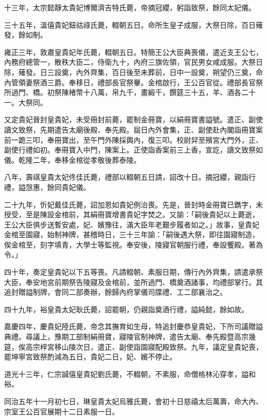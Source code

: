 \begin{pinyinscope}
十三年，太宗懿靜太貴妃博爾濟吉特氏薨，帝摘冠纓，躬詣致祭，餘同太妃儀。

三十五年，溫僖貴妃鈕祜祿氏薨，輟朝五日。命所生皇子成服，大祭日除，百日薙發，餘如制。

雍正三年，敦肅皇貴妃年氏薨，輟朝五日。特簡王公大臣典喪儀，遣近支王公七，內務府總管一，散秩大臣二，侍衛九十，內府三旗佐領，官民男女咸成服。大祭日除，薙發。日三設奠，內外齊集，百日後至未葬前，日中一設奠，朔望仍三奠，命內管領妻祭酒三爵。奉移日，禮部長官祭轝。金棺啟行，王公百官從。禮部長官祭所過門、橋。初祭陳楮幣十八萬，帛九千，畫緞千，饌筵三十五，羊、酒各二十一。大祭同。

又定貴妃晉封皇貴妃，未受冊封前薨，罷制金冊寶，以絹冊寶書謚號。遣正、副使讀文致祭，先期遣告太廟後殿、奉先殿。屆日內外會集，正、副使赴內閣詣冊寶案前一跪三叩，奉冊寶出，至午門外陳採輿內，復三叩。校尉舁至殯宮大門外，正、副使行禮如初。奉冊寶入中門，陳案上。正使詣香案前三上香，宣訖，讀文致祭如儀。乾隆二年，奉移金棺從孝敬後葬泰陵。

八年，壽祺皇貴太妃佟佳氏薨，禮部以輟朝五日請，詔改十日。摘冠纓，親詣行禮，謚愨惠，餘同貴妃儀。

二十九年，忻妃戴佳氏薨，詔加恩如貴妃例治喪。先是，晉封時金冊寶已鐫字，未授受，至是陳設金棺前，其絹冊寶增書貴妃字焚之。又諭：「嗣後貴妃以上薨逝，王公大臣俱步送暫安處，妃、嬪豫往，滿大臣年老艱步履者如之。」故事，皇貴妃金棺至園寢，始制神牌，甚稽時日，三十三年諭：「嗣後遇大祭，即往園寢制造，俟金棺至，刻字填青，大學士等監視。奉安後，陵寢官朝服行禮，奉設饗殿。著為令。」

四十年，奏定皇貴妃以下五等喪。凡請輟朝、素服日期，傳行內外齊集，請遣承祭大臣，奉安地宮前期祭告陵寢及金棺前，並所過門、橋奠酒諸事，均禮部掌行。其追封贈謚制牌，會同二部奏辦，餘歸內府掌儀司牒禮、工二部襄治之。

四十九年，裕皇貴太妃耿氏薨，詔罷朝，仍親詣奠酒行禮，謚純懿，餘如故。

嘉慶四年，慶貴妃陸氏薨，帝念其撫育如生母，特追封慶恭皇貴妃，下所司議贈謚典禮。尋議上，豫期工部制絹冊寶，寢陵官制神牌，遣告太廟、奉先殿暨高宗幾筵，俟高宗梓宮移山陵次日，遣正、副使詣園寢配殿致祭。九年，議定皇貴妃喪，罷坤寧宮致祭酌減為五日，貴妃二日，妃、嬪不停止。

道光十三年，仁宗諴僖皇貴妃劉氏薨，不輟朝，不素服，命僧格林沁穿孝，謚和裕。

同治五年十一月初七日，琳皇貴太妃烏雅氏薨，會初十日慈禧太后萬壽，命大內、宗室王公百官展期十二日素服一日。


\end{pinyinscope}